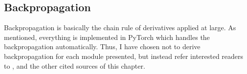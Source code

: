 \subsection{Backpropagation}
\label{sec:backprob}
Backpropagation is basically the chain rule of derivatives applied at large.
As mentioned, everything is implemented in PyTorch which handles the backpropagation automatically.
Thus, I have chosen not to derive backpropagation for each module presented, but instead refer interested readers to \cite{goodfellowDeepLearning2016}, and the other cited sources of this chapter.
%
%
%
%
